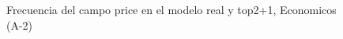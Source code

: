 \begin{figure}[H]
    \centering
    
    \caption{Frecuencia del campo  price en el modelo real y top2+1, Economicos (A-2)}
    \label{frecuency- Price-top2+1}
\end{figure}